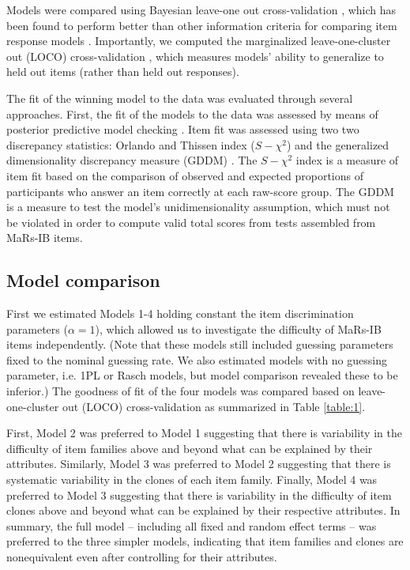 \documentclass[a4paper,man,natbib]{apa6}
\begin{document}
Models were compared using Bayesian leave-one out cross-validation \citep{vehtari2017practical}, which has been found to perform better than other information criteria for comparing item response models \citep{luo2017performances}. Importantly, we computed the marginalized leave-one-cluster out (LOCO) cross-validation \citep{merkle2019bayesian}, which measures models' ability to generalize to held out items (rather than held out responses). 

The fit of the winning model to the data was evaluated through several approaches. First, the fit of the models to the data was assessed by means of posterior predictive model checking \citep{gelman1996posterior}. Item fit was assessed using two two discrepancy statistics: Orlando and Thissen index ($S-\chi^2$) \citep{toribio2011discrepancy} and the generalized dimensionality discrepancy measure (GDDM) \citep{levy2009posterior, levy2011generalized}. The $S-\chi^2$ index is a measure of item fit based on the comparison of observed and expected proportions of participants who answer an item correctly at each raw-score group. The GDDM is a measure to test the model's unidimensionality assumption, which must not be violated in order to compute valid total scores from tests assembled from MaRs-IB items.

\subsection{Model comparison}

First we estimated Models 1-4 holding constant the item discrimination parameters ($\alpha = 1$), which allowed us to investigate the difficulty of MaRs-IB items independently. (Note that these models still included guessing parameters fixed to the nominal guessing rate. We also estimated models with no guessing parameter, i.e. 1PL or Rasch models, but model comparison revealed these to be inferior.) The goodness of fit of the four models was compared based on leave-one-cluster out (LOCO) cross-validation as summarized in Table \ref{table:1}. 

First, Model 2 was preferred to Model 1 suggesting that there is variability in the difficulty of item families above and beyond what can be explained by their attributes. Similarly, Model 3 was preferred to Model 2 suggesting that there is systematic variability in the clones of each item family. Finally, Model 4 was preferred to Model 3 suggesting that there is variability in the difficulty of item clones above and beyond what can be explained by their respective attributes. In summary, the full model -- including all fixed and random effect terms -- was preferred to the three simpler models, indicating that item families and clones are nonequivalent even after controlling for their attributes.
\end{document}
